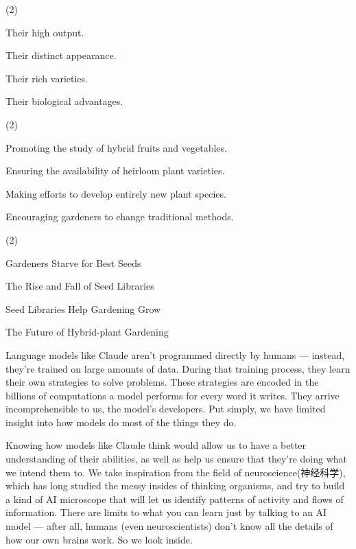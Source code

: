 \documentclass{英语试卷}
\begin{document}
\begin{choices}(2)
  \item Their high output.
  \item Their distinct appearance.
  \item Their rich varieties.
  \item Their biological advantages.
\end{choices}
\begin{choices}(2)
  \item Promoting the study of hybrid fruits and vegetables.
  \item Ensuring the availability of heirloom plant varieties.
  \item Making efforts to develop entirely new plant species.
  \item Encouraging gardeners to change traditional methods.
\end{choices}
\begin{choices}(2)
  \item Gardeners Starve for Best Seeds
  \item The Rise and Fall of Seed Libraries
  \item Seed Libraries Help Gardening Grow
  \item The Future of Hybrid-plant Gardening
\end{choices}
\par Language models like Claude aren't programmed directly by humans — instead, they're trained on large amounts of data. During that training process, they learn their own strategies to solve problems. These strategies are encoded in the billions of computations a model performs for every word it writes. They arrive incomprehensible to us, the model's developers. Put simply, we have limited insight into how models do most of the things they do.\par
\par Knowing how models like Claude think would allow us to have a better understanding of their abilities, as well as help us ensure that they're doing what we intend them to. We take inspiration from the field of neuroscience(神经科学), which has long studied the messy insides of thinking organisms, and try to build a kind of AI microscope that will let us identify patterns of activity and flows of information. There are limits to what you can learn just by talking to an AI model — after all, humans (even neuroscientists) don't know all the details of how our own brains work. So we look inside.\par
\end{document}
